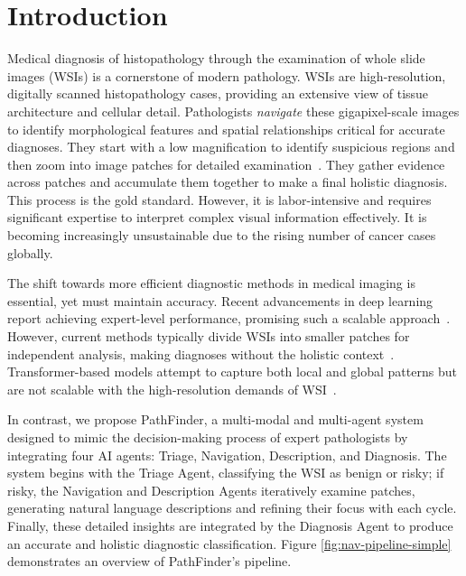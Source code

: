 
\section{Introduction}
\label{sec:intro}


Medical diagnosis of histopathology through the examination of whole slide images (WSIs) is a cornerstone of modern pathology. WSIs are high-resolution, digitally scanned histopathology cases, providing an extensive view of tissue architecture and cellular detail. 
Pathologists \textit{navigate} these gigapixel-scale images to identify morphological features and spatial relationships critical for accurate diagnoses. 
They start with a low magnification to identify suspicious regions and then zoom into image patches for detailed examination~\cite{ghezloo2022analysis, liu2024semantics}. They gather evidence across patches and accumulate them together to make a final holistic diagnosis. 
This process is the gold standard. However, it is labor-intensive and requires significant expertise to interpret complex visual information effectively. 
It is becoming increasingly unsustainable due to the rising number of cancer cases globally.

The shift towards more efficient diagnostic methods in medical imaging is essential, yet must maintain accuracy. Recent advancements in deep learning report achieving expert-level performance, promising such a scalable approach~\cite{topol2019high}. 
However, current methods typically divide WSIs into smaller patches for independent analysis, making diagnoses without the holistic context~\cite{li2021dual, yang2024foundation, zhou2024pathm3,seyfioglu2024quilt, sun2024pathgen, ahmed2024pathalign, xu2024whole, ikezogwo2023quilt, gu2023augmenting}. 
Transformer-based models attempt to capture both local and global patterns but are not scalable with the high-resolution demands of WSI~\cite{shao2021transmil, wu2021scale, guo2023higt, zheng2022graph, chen2022scaling}.


In contrast, we propose PathFinder, a multi-modal and multi-agent system designed to mimic the decision-making process of expert pathologists by integrating four AI agents: Triage, Navigation, Description, and Diagnosis. The system begins with the Triage Agent, classifying the WSI as benign or risky; if risky, the Navigation and Description Agents iteratively examine patches, generating natural language descriptions and refining their focus with each cycle. Finally, these detailed insights are integrated by the Diagnosis Agent to produce an accurate and holistic diagnostic classification. Figure \ref{fig:nav-pipeline-simple} demonstrates an overview of PathFinder's pipeline.

